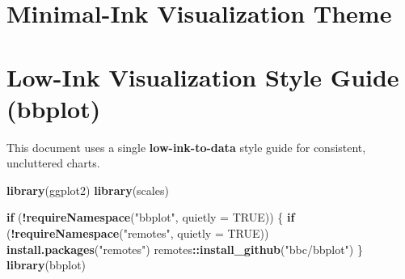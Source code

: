 \documentclass[
  11pt,
]{article}
\newenvironment{Shaded}{\begin{snugshade}}{\end{snugshade}}
\newcommand{\AttributeTok}[1]{\textcolor[rgb]{0.13,0.29,0.53}{#1}}
\newcommand{\ConstantTok}[1]{\textcolor[rgb]{0.56,0.35,0.01}{#1}}
\newcommand{\ControlFlowTok}[1]{\textcolor[rgb]{0.13,0.29,0.53}{\textbf{#1}}}
\newcommand{\FunctionTok}[1]{\textcolor[rgb]{0.13,0.29,0.53}{\textbf{#1}}}
\newcommand{\NormalTok}[1]{#1}
\newcommand{\SpecialCharTok}[1]{\textcolor[rgb]{0.81,0.36,0.00}{\textbf{#1}}}
\newcommand{\StringTok}[1]{\textcolor[rgb]{0.31,0.60,0.02}{#1}}
\begin{document}
\section{Minimal-Ink Visualization
Theme}\label{minimal-ink-visualization-theme}

\section{Low-Ink Visualization Style Guide
(bbplot)}\label{low-ink-visualization-style-guide-bbplot}

This document uses a single \textbf{low-ink-to-data} style guide for
consistent, uncluttered charts.

\begin{Shaded}
\begin{Highlighting}[]
\FunctionTok{library}\NormalTok{(ggplot2)}
\FunctionTok{library}\NormalTok{(scales)}

\ControlFlowTok{if}\NormalTok{ (}\SpecialCharTok{!}\FunctionTok{requireNamespace}\NormalTok{(}\StringTok{"bbplot"}\NormalTok{, }\AttributeTok{quietly =} \ConstantTok{TRUE}\NormalTok{)) \{}
  \ControlFlowTok{if}\NormalTok{ (}\SpecialCharTok{!}\FunctionTok{requireNamespace}\NormalTok{(}\StringTok{"remotes"}\NormalTok{, }\AttributeTok{quietly =} \ConstantTok{TRUE}\NormalTok{)) }\FunctionTok{install.packages}\NormalTok{(}\StringTok{"remotes"}\NormalTok{)}
\NormalTok{  remotes}\SpecialCharTok{::}\FunctionTok{install\_github}\NormalTok{(}\StringTok{"bbc/bbplot"}\NormalTok{)}
\NormalTok{\}}
\FunctionTok{library}\NormalTok{(bbplot)}


\end{Highlighting}
\end{Shaded}
\end{document}
